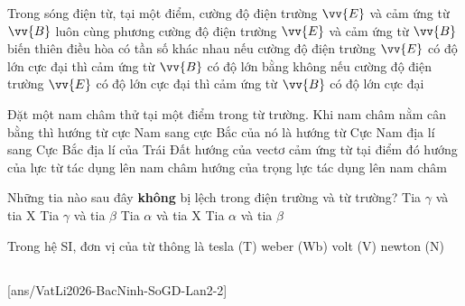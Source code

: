 	\begin{ex}%
		Trong sóng điện từ, tại một điểm,
		\choice
		{cường độ điện trường $\vv{E}$ và cảm ứng từ $\vv{B}$ luôn cùng phương}
		{cường độ điện trường $\vv{E}$ và cảm ứng từ $\vv{B}$ biến thiên điều hòa có tần số khác nhau}
		{nếu cường độ điện trường $\vv{E}$ có độ lớn cực đại thì cảm ứng từ $\vv{B}$ có độ lớn bằng không}
		{\True nếu cường độ điện trường $\vv{E}$ có độ lớn cực đại thì cảm ứng từ $\vv{B}$ có độ lớn cực đại}
	\end{ex}

	\begin{ex}%
		Đặt một nam châm thử tại một điểm trong từ trường. Khi nam châm nằm cân bằng thì hướng từ cực Nam sang cực Bắc của nó là
		\choice
		{hướng từ Cực Nam địa lí sang Cực Bắc địa lí của Trái Đất}
		{\True hướng của vectơ cảm ứng từ tại điểm đó}
		{hướng của lực từ tác dụng lên nam châm}
		{hướng của trọng lực tác dụng lên nam châm}
	\end{ex}

	\begin{ex}%
		Những tia nào sau đây \textbf{không} bị lệch trong điện trường và từ trường?
		\choice
		{\True Tia $\gamma$ và tia X}
		{Tia $\gamma$ và tia $\beta$}
		{Tia $\alpha$ và tia X}
		{Tia $\alpha$ và tia $\beta$}
	\end{ex}

	\begin{ex}%
		Trong hệ SI, đơn vị của từ thông là
		\choice
		{tesla (T)}
		{\True weber (Wb)}
		{volt (V)}
		{newton (N)}
	\end{ex}

	\subsection*{}
	\setcounter{ex}{0}
	[ans/VatLi2026-BacNinh-SoGD-Lan2-2]

